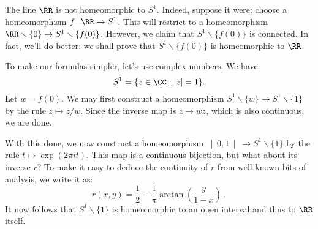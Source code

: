 \begin{exm}
	The line $\RR$ is not homeomorphic to $S^1$.
	Indeed, suppose it were; choose a homeomorphism $f \colon \RR \to S^1$.
	This will restrict to a homeomorphism $\RR \smallsetminus \{0\} \to S^1\smallsetminus\{f(0)\}$.
	However, we claim that $S^1 \smallsetminus \{f(0)\} $ is connected.
	In fact, we'll do better: we shall prove that $S^1 \smallsetminus \{f(0)\}$ is homeomorphic to $\RR$.

	To make our formulas simpler, let's use complex numbers.%
	We have:
	\[
		S^1 = \{z \in \CC : |z| = 1 \}.
	\]
	Let $w = f(0)$.
	We may first construct a homeomorphism $S^1\smallsetminus\{w\} \to S^1 \smallsetminus \{1\} $ by the rule $ z \mapsto z/w $.
	Since the inverse map is $ z \mapsto wz$, which is also continuous, we are done.

	With this done, we now construct a homeomorphism $\left]0,1\right[ \to S^1 \smallsetminus \{1\}$ by the rule $t \mapsto \exp(2\pi i t) $.
	This map is a continuous bijection, but what about its inverse $r$?
	To make it easy to deduce the continuity of $r$ from well-known bits of analysis, we write it as:%
	\[
		r(x,y) = \frac{1}{2}-\frac{1}{\pi}\arctan\left(\frac{y}{1-x}\right) \period
	\]
	It now follows that $S^1\smallsetminus\{1\}$ is homeomorphic to an open interval and thus to $\RR$ itself.
\end{exm}

